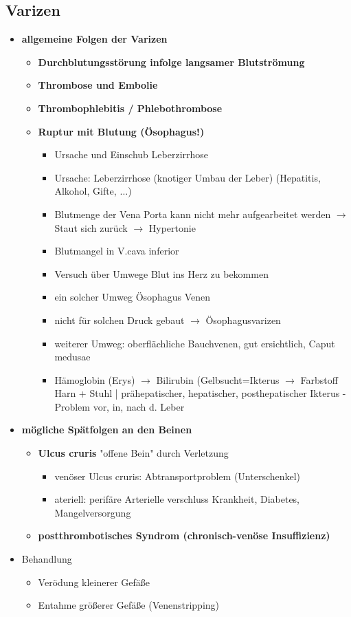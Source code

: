 \subsection{Varizen}
	\begin{itemize}
		\item \textbf{allgemeine Folgen der Varizen}
			\begin{itemize}
				\item \textbf{Durchblutungsstörung infolge langsamer Blutströmung}
				\item \textbf{Thrombose und Embolie}
				\item \textbf{Thrombophlebitis / Phlebothrombose}
				\item \textbf{Ruptur mit Blutung (Ösophagus!)}
					\begin{itemize}
						\item Ursache und Einschub Leberzirrhose
						\item Ursache: Leberzirrhose (knotiger Umbau der Leber) (Hepatitis, Alkohol, Gifte, $\dots$)
						\item Blutmenge der Vena Porta kann nicht mehr aufgearbeitet werden $\rightarrow$ Staut sich zurück $\rightarrow$ Hypertonie
						\item Blutmangel in V.cava inferior 
						\item Versuch über Umwege Blut ins Herz zu bekommen
						\item ein solcher Umweg Ösophagus Venen 
						\item nicht für solchen Druck gebaut $\rightarrow$ Ösophagusvarizen
						\item weiterer Umweg: oberflächliche Bauchvenen, gut ersichtlich, Caput medusae
						\item Hämoglobin (Erys) $\rightarrow$ Bilirubin (Gelbsucht=Ikterus $\rightarrow$ Farbstoff Harn + Stuhl | prähepatischer, hepatischer, posthepatischer Ikterus - Problem vor, in, nach d. Leber
					\end{itemize}
			\end{itemize}
\pagebreak
		\item \textbf{mögliche Spätfolgen an den Beinen}
			\begin{itemize}
				\item \textbf{Ulcus cruris} "offene Bein" durch Verletzung
					\begin{itemize}
						\item venöser Ulcus cruris: Abtransportproblem (Unterschenkel)
						\item ateriell: perifäre Arterielle verschluss Krankheit, Diabetes, Mangelversorgung
					\end{itemize}
				\item \textbf{postthrombotisches Syndrom (chronisch-venöse Insuffizienz)}
			\end{itemize}
		\item Behandlung
			\begin{itemize}
				\item Verödung kleinerer Gefäße
				\item Entahme größerer Gefäße (Venenstripping)
			\end{itemize}
	\end{itemize}
	
